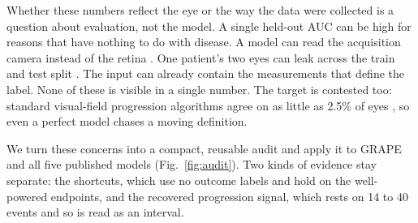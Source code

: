 Whether these numbers reflect the eye or the way the data were collected is a question about evaluation, not the model.
A single held-out AUC can be high for reasons that have nothing to do with disease. A model can read the
acquisition camera instead of the retina \citep{geirhos2020, badgeley2019confound, degrave2021}. One patient's two eyes
can leak across the train and test split \citep{tampu2022leakage, kapoor2023leakage}. The input can already contain the
measurements that define the label. None of these is visible in a single number. The target is contested too: standard
visual-field progression algorithms agree on as little as \num{2.5}\% of eyes \citep{saeedi2019}, so even a perfect
model chases a moving definition.

We turn these concerns into a compact, reusable audit and apply it to GRAPE and all five published models
(Fig.~\ref{fig:audit}). Two kinds of evidence stay separate: the shortcuts, which use no outcome labels and hold on the
well-powered endpoints, and the recovered progression signal, which rests on \num{14} to \num{40} events
\citep{riley2020samplesize} and so is read as an interval.

